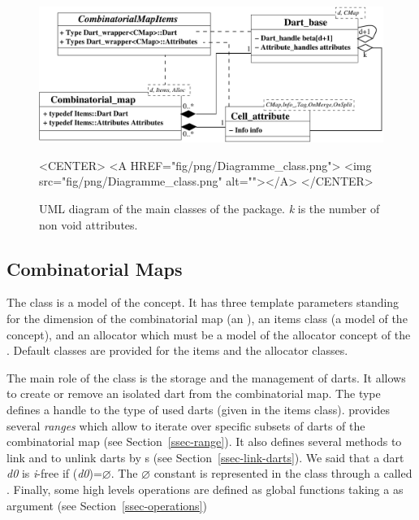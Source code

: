 \begin{figure}
  \begin{ccTexOnly}
    \begin{center}
      \includegraphics[width=.95\textwidth]
      {Combinatorial_map/fig/pdf/Diagramme_class}
    \end{center}
  \end{ccTexOnly}
  \begin{ccHtmlOnly}
    <CENTER>
    <A HREF="fig/png/Diagramme_class.png">
        <img src="fig/png/Diagramme_class.png" alt=""></A>
    </CENTER>
    \end{ccHtmlOnly}
    \caption{UML diagram of the main classes of the package. \emph{k} is the number of
      non void attributes.}
    \label{fig-diagram_class}
\end{figure}

\subsection{Combinatorial Maps}\label{ssec-combinatorial-map}
The class  is a model of the
 concept.  It has three template parameters
standing for the dimension of the combinatorial map (an 
), an items class (a model of the 
concept), and an allocator which must be a model of the allocator
concept of the {\stl}.  Default classes are provided for the items and
the allocator classes.

The main role of the class  is the storage and
the management of darts. It allows to create or remove an isolated
dart from the combinatorial map.  The  type defines a
handle to the type of used darts (given in the items class).
 provides several \emph{ranges} which allow to
iterate over specific subsets of darts of the combinatorial map (see
Section~\ref{ssec-range}).  It also defines several methods to link
and to unlink darts by \betai{}s (see
Section~\ref{ssec-link-darts}). We said that a dart \emph{d0} is \emph{i}-free 
if \betai{}(\emph{d0})=$\varnothing$.   The $\varnothing$ constant is
represented in the class  through a 
called \nulldart.  Finally, some high levels
operations are defined as global functions taking a
 as argument (see
Section~\ref{ssec-operations})

